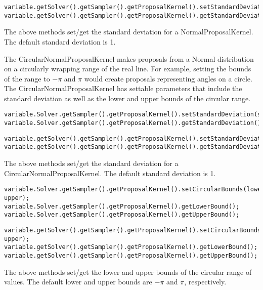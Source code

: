 \ifjava
\begin{lstlisting}
variable.getSolver().getSampler().getProposalKernel().setStandardDeviation(std);
variable.getSolver().getSampler().getProposalKernel().getStandardDeviation();
\end{lstlisting}
\fi

The above methods set/get the standard deviation for a NormalProposalKernel.  The default standard deviation is 1.

The CircularNormalProposalKernel makes proposals from a Normal distribution on a circularly wrapping range of the real line.  For example, setting the bounds of the range to $-\pi$ and $\pi$ would create proposals representing angles on a circle.  The CircularNormalProposalKernel has settable parameters that include the standard deviation as well as the lower and upper bounds of the circular range.

\ifmatlab
\begin{lstlisting}
variable.Solver.getSampler().getProposalKernel().setStandardDeviation(std);
variable.Solver.getSampler().getProposalKernel().getStandardDeviation();
\end{lstlisting}
\fi

\ifjava
\begin{lstlisting}
variable.getSolver().getSampler().getProposalKernel().setStandardDeviation(std);
variable.getSolver().getSampler().getProposalKernel().getStandardDeviation();
\end{lstlisting}
\fi

The above methods set/get the standard deviation for a CircularNormalProposalKernel.  The default standard deviation is 1.

\ifmatlab
\begin{lstlisting}
variable.Solver.getSampler().getProposalKernel().setCircularBounds(lower, upper);
variable.Solver.getSampler().getProposalKernel().getLowerBound();
variable.Solver.getSampler().getProposalKernel().getUpperBound();
\end{lstlisting}
\fi

\ifjava
\begin{lstlisting}
variable.getSolver().getSampler().getProposalKernel().setCircularBounds(lower, upper);
variable.getSolver().getSampler().getProposalKernel().getLowerBound();
variable.getSolver().getSampler().getProposalKernel().getUpperBound();
\end{lstlisting}
\fi

The above methods set/get the lower and upper bounds of the circular range of values.  The default lower and upper bounds are $-\pi$ and $\pi$, respectively.


